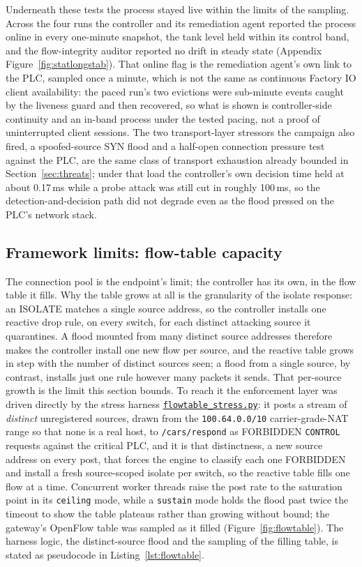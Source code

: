 Underneath these tests the process stayed live within the limits of the sampling. Across the four runs the controller and its remediation agent reported the process online in every one-minute snapshot, the tank level held within its control band, and the flow-integrity auditor reported no drift in steady state (Appendix Figure~\ref{fig:statlongstab}). That online flag is the remediation agent's own link to the PLC, sampled once a minute, which is not the same as continuous Factory IO client availability: the paced run's two evictions were sub-minute events caught by the liveness guard and then recovered, so what is shown is controller-side continuity and an in-band process under the tested pacing, not a proof of uninterrupted client sessions. The two transport-layer stressors the campaign also fired, a spoofed-source SYN flood and a half-open connection pressure test against the PLC, are the same class of transport exhaustion already bounded in Section~\ref{sec:threats}; under that load the controller's own decision time held at about 0.17\,ms while a probe attack was still cut in roughly 100\,ms, so the detection-and-decision path did not degrade even as the flood pressed on the PLC's network stack.

\subsection{Framework limits: flow-table capacity}
\label{sec:evalflowtable}

The connection pool is the endpoint's limit; the controller has its own, in the flow table it fills. Why the table grows at all is the granularity of the isolate response: an ISOLATE matches a single source address, so the controller installs one reactive drop rule, on every switch, for each distinct attacking source it quarantines. A flood mounted from many distinct source addresses therefore makes the controller install one new flow per source, and the reactive table grows in step with the number of distinct sources seen; a flood from a single source, by contrast, installs just one rule however many packets it sends. That per-source growth is the limit this section bounds. To reach it the enforcement layer was driven directly by the stress harness \href{\repourl/blob/main/07_Evaluation/overnight/flowtable_stress.py}{\texttt{flowtable\_stress.py}}: it posts a stream of \emph{distinct} unregistered sources, drawn from the \texttt{100.64.0.0/10} carrier-grade-NAT range so that none is a real host, to \texttt{/cars/respond} as FORBIDDEN \texttt{CONTROL} requests against the critical PLC, and it is that distinctness, a new source address on every post, that forces the engine to classify each one FORBIDDEN and install a fresh source-scoped isolate per switch, so the reactive table fills one flow at a time. Concurrent worker threads raise the post rate to the saturation point in its \texttt{ceiling} mode, while a \texttt{sustain} mode holds the flood past twice the timeout to show the table plateaus rather than growing without bound; the gateway's OpenFlow table was sampled as it filled (Figure~\ref{fig:flowtable}). The harness logic, the distinct-source flood and the sampling of the filling table, is stated as pseudocode in Listing~\ref{lst:flowtable}.

